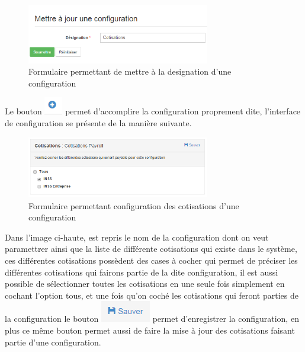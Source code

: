 \documentclass[12pt,a4paper]{report}
\begin{document}
\begin{figure}[h]
\begin{center}
\includegraphics[width=8cm]{pic/MetJCotisation.png}
\end{center}
\caption{Formulaire permettant de mettre à la designation d'une configuration}
\label{Formulaire permettant de mettre à la designation d'une configuration}
\end{figure} 

Le bouton  \includegraphics[scale=0.7]{pic/PlusConfigBlue.png} permet d'accomplire la configuration proprement dite, l'interface de configuration se présente de la manière suivante.  
\begin{figure}[h]
\begin{center}
\includegraphics[width=8cm]{pic/CotisationInPayroll.png}
\end{center}
\caption{Formulaire permettant configuration des cotisations d'une configuration}
\label{Formulaire permettant configuration des cotisations d'une configuration}
\end{figure} 

Dans l'image ci-haute, est repris le nom de la configuration dont on veut paramettrer ainsi que la liste de différente cotisations qui existe dans le système, ces différentes cotisations possèdent des cases à cocher qui permet de préciser les différentes cotisations qui fairons partie de la dite configuration, il est aussi possible de sélectionner toutes les cotisations en une seule fois simplement en cochant l'option tous, et une fois qu'on coché les cotisations qui feront parties de la configuration le bouton \includegraphics[scale=0.7]{pic/SaveConfig.png} permet d'enregistrer la configuration, en plus ce même bouton permet aussi de faire la mise à jour des cotisations faisant partie d'une configuration.
\end{document}
